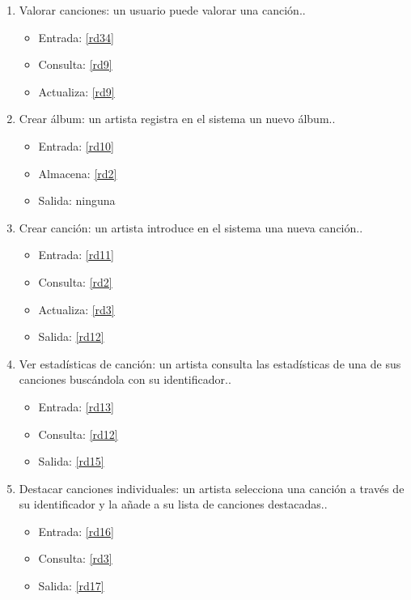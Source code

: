 \documentclass[12pt,a4paper]{article}
\begin{document}
\begin{enumerate}[label=\textnormal{RF\arabic*}]
	 \item Valorar canciones: un usuario puede valorar una canción.\label{rf6}.
    	\begin{itemize}
			\item Entrada: \ref{rd34}
			\item Consulta: \ref{rd9}
			\item Actualiza: \ref{rd9}
		\end{itemize}
		
		
	 \item Crear álbum: un artista registra en el sistema un nuevo álbum.\label{rf7}.
    	\begin{itemize}
			\item Entrada: \ref{rd10}
			\item Almacena: \ref{rd2}
			\item Salida: ninguna
		\end{itemize}
		
	 \item Crear canción: un artista introduce en el sistema una nueva canción.\label{rf8}.
    	\begin{itemize}
			\item Entrada: \ref{rd11}
			\item Consulta: \ref{rd2}
			\item Actualiza: \ref{rd3}
			\item Salida: \ref{rd12} 
		\end{itemize}
		
	 \item Ver estadísticas de canción: un artista consulta las estadísticas de una de sus canciones buscándola con su identificador.\label{rf9}.
    	\begin{itemize}
			\item Entrada: \ref{rd13}
			\item Consulta: \ref{rd12}
			\item Salida: \ref{rd15}
		\end{itemize}
		
	 \item Destacar canciones individuales: un artista selecciona una canción a través de su identificador y la añade a su lista de canciones destacadas.\label{rf10}.
    	\begin{itemize}
			\item Entrada: \ref{rd16}
			\item Consulta: \ref{rd3}
			\item Salida: \ref{rd17}
		\end{itemize}
		

\end{enumerate}
\end{document}
